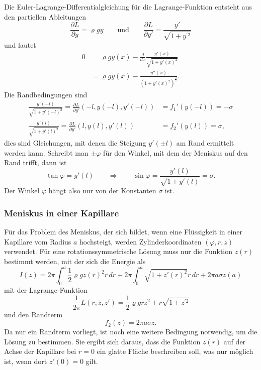 

Die Euler-Lagrange-Differentialgleichung für die Lagrange-Funktion entsteht
aus den partiellen Ableitungen
\[
\frac{\partial L}{\partial y}
=
\varrho g y
\qquad\text{und}\qquad
\frac{\partial L}{\partial y'}
=
\frac{y'}{\sqrt{1+y^{\prime 2}}}
\]
und lautet
\begin{align*}
0
&=
\varrho g y(x)
-
\frac{d}{dx}
\frac{y'(x)}{\sqrt{1+y'(x)^2}}
\\
&=
\varrho g y(x)
-
\frac{ y''(x) }{(1+y'(x)^2)^{\frac32}}.
\end{align*}
Die Randbedingungen sind
\begin{align*}
\frac{y'(-l)}{\sqrt{1+y'(-l)^2}}
=
\frac{\partial L}{\partial y'}(-l,y(-l),y'(-l)) &= f_1'(y(-l)) = -\sigma
\\
\frac{y'(l)}{\sqrt{1+y'(l)^2}}
=
\frac{\partial L}{\partial y'}(l,y(l),y'(l)) &= f_2'(y(l)) = \sigma,
\end{align*}
dies sind Gleichungen, mit denen die Steigung $y'(\pm l)$ am Rand ermittelt
werden kann.
Schreibt man $\pm \varphi$ für den Winkel, mit dem der Meniskus auf
den Rand trifft, dann ist
\[
\tan\varphi
=
y'(l)
\qquad
\Rightarrow
\qquad
\sin\varphi
=
\frac{y'(l)}{\sqrt{1+y'(l)}}
=
\sigma.
\]
Der Winkel $\varphi$ hängt also nur von der Konstanten $\sigma$ ist.

%
%
\subsubsection{Meniskus in einer Kapillare}
Für das Problem des Meniskus, der sich bildet, wenn eine Flüssigkeit
in einer Kapillare vom Radius $a$ hochsteigt, werden Zylinderkoordinaten
$(\varphi,r,z)$ verwendet.
Für eine rotationssymmetrische Lösung muss nur die Funktion $z(r)$ 
bestimmt werden, mit der sich die Energie als
\[
I(z)
=
2\pi
\int_0^a
\frac12
\varrho g
z(r)^2
r
\,dr
+
2\pi
\int_0^a
\sqrt{1+z'(r)^2}
r\,dr
+
2\pi a
\sigma z(a)
\]
mit der Lagrange-Funktion
\[
\frac{1}{2\pi}
L(r, z, z')
=
\frac12
\varrho g
r
z^2 
+
r
\sqrt{1+z^{\prime 2}}
\]
und den Randterm
\[
f_2(z) = 2\pi a \sigma z.
\]
Da nur ein Randterm vorliegt, ist noch eine weitere Bedingung notwendig,
um die Lösung zu bestimmen.
Sie ergibt sich daraus, dass die Funktion $z(r)$ auf der Achse der Kapillare
bei $r=0$ ein glatte Fläche beschreiben soll, was nur möglich ist, wenn dort
$z'(0)=0$ gilt.

